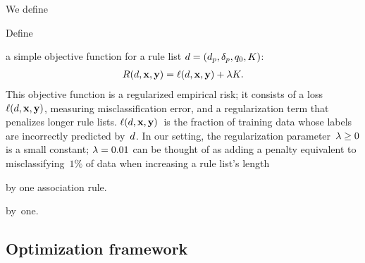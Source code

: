 \begin{arxiv}
We define
\end{arxiv}
\begin{kdd}
Define
\end{kdd}
a simple objective function for a rule list ${{d} = (d_p, \delta_p, q_0, K)}$:
\begin{align}
\Obj(\RL, \x, \y) = \Loss(\RL, \x, \y) + \Reg K.
\label{eq:objective}
\end{align}
This objective function is a regularized empirical risk;
it consists of a loss~$\ell({d}, \mathbf{x}, \mathbf{y})$, measuring misclassification error,
and a regularization term that penalizes longer rule lists.
%
$\ell({d}, \mathbf{x}, \mathbf{y})$~is the fraction of training data whose labels are
incorrectly predicted by~${d}$.
%
In our setting, the regularization parameter~${{\lambda} \ge 0}$ is a small constant;
\eg ${{\lambda} = 0.01}$ can be thought of as adding a penalty equivalent to misclassifying~$1\%$
of data when increasing a rule list's length
\begin{arxiv}
by one association rule.
\end{arxiv}
\begin{kdd}
by~one.
\end{kdd}
%

\subsection{Optimization framework}

